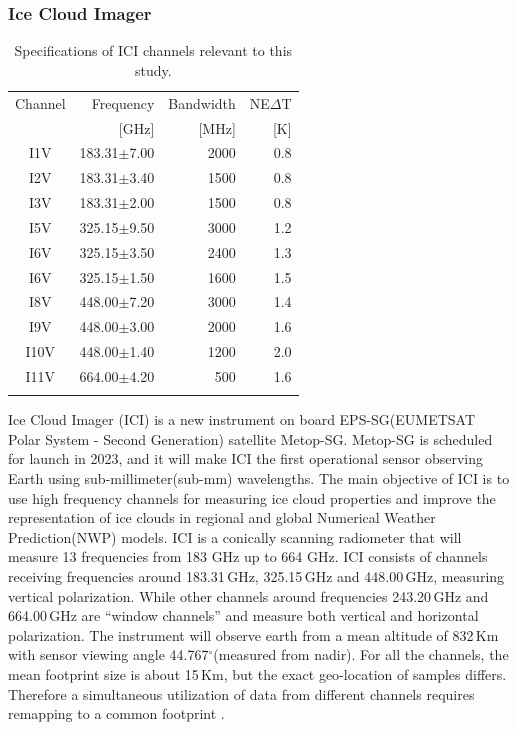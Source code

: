 \documentclass[amt]{copernicus}
\begin{document}
\subsubsection{Ice Cloud Imager}
%
\begin{table}[t]	
	\caption{Specifications of ICI channels relevant to this study.}
	\label{tab:ICI_MWI_channels}
	\begin{tabular}{crrr}
		\tophline
		Channel & Frequency 	& Bandwidth  	&NE$\Delta$T	\\
				& [GHz]			& [MHz]			& [K]			\\
		\middlehline
		I1V&	183.31$\pm$7.00    & 2000 			& 0.8 		\\
		I2V&	183.31$\pm$3.40    & 1500 			& 0.8 		\\
		I3V&	183.31$\pm$2.00    & 1500			& 0.8 		\\
		I5V&	325.15$\pm$9.50    & 3000			& 1.2 		\\
		I6V&	325.15$\pm$3.50    & 2400			& 1.3 		\\
		I6V&	325.15$\pm$1.50    & 1600			& 1.5 		\\
		I8V&	448.00$\pm$7.20    & 3000			& 1.4 		\\
		I9V&	448.00$\pm$3.00    & 2000			& 1.6 		\\
		I10V&	448.00$\pm$1.40    & 1200			& 2.0 		\\
		I11V&	664.00$\pm$4.20    & \phantom{0}500	& 1.6 		\\		
		\bottomhline
	\end{tabular}
	\belowtable{} %
\end{table}

Ice Cloud Imager (ICI) is a new instrument on board EPS-SG(EUMETSAT Polar System - Second Generation) satellite Metop-SG. Metop-SG is scheduled for launch in 2023, and it will make ICI the first operational sensor observing Earth using sub-millimeter(sub-mm) wavelengths. The main objective of ICI is to use high frequency channels for measuring ice cloud properties and improve the representation of ice clouds in regional and global Numerical Weather Prediction(NWP) models. ICI is a conically scanning radiometer that will measure 13 frequencies from 183 GHz up to 664 GHz.  ICI consists of channels receiving frequencies around 183.31\,GHz, 325.15\,GHz and 448.00\,GHz, measuring vertical polarization. While other channels around frequencies 243.20\,GHz and 664.00\,GHz are ``window channels'' and measure both vertical and horizontal polarization. The instrument will observe earth from a mean altitude of 832\,Km with sensor viewing angle 44.767$^\circ$(measured from nadir). For all the channels, the mean footprint size is about 15\,Km, but the exact geo-location of samples differs. Therefore a simultaneous utilization of data from different channels requires remapping to a common footprint \citep{eriksson:towar:20}.
\end{document}
